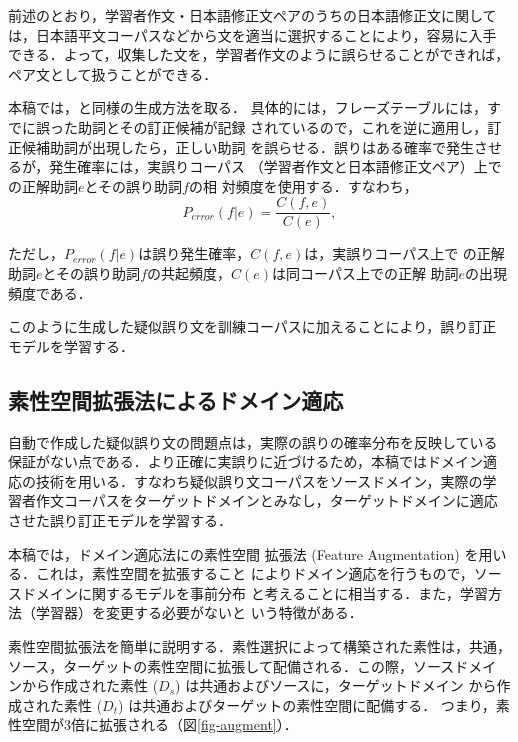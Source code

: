 \documentclass[japanese]{jnlp_1.4}
\begin{document}
前述のとおり，学習者作文・日本語修正文ペアのうちの日本語修正文に関して
は，日本語平文コーパスなどから文を適当に選択することにより，容易に入手
できる．よって，収集した文を，学習者作文のように誤らせることができれば，
ペア文として扱うことができる．

本稿では，と同様の生成方法を取る．
具体的には，フレーズテーブルには，すでに誤った助詞とその訂正候補が記録
されているので，これを逆に適用し，訂正候補助詞が出現したら，正しい助詞
を誤らせる．誤りはある確率で発生させるが，発生確率には，実誤りコーパス
（学習者作文と日本語修正文ペア）上での正解助詞$e$とその誤り助詞$f$の相
対頻度を使用する．すなわち，
\begin{equation}
P_{error}(f|e)  =  \frac{C(f,e)}{C(e)},
\end{equation}

ただし，$P_{error}(f|e)$は誤り発生確率，$C(f,e)$は，実誤りコーパス上で
の正解助詞$e$とその誤り助詞$f$の共起頻度，$C(e)$は同コーパス上での正解
助詞$e$の出現頻度である．

このように生成した疑似誤り文を訓練コーパスに加えることにより，誤り訂正
モデルを学習する．



\subsection{素性空間拡張法によるドメイン適応}
\label{sec-domain-adaptation}

自動で作成した疑似誤り文の問題点は，実際の誤りの確率分布を反映している
保証がない点である．より正確に実誤りに近づけるため，本稿ではドメイン適
応の技術を用いる．すなわち疑似誤り文コーパスをソースドメイン，実際の学
習者作文コーパスをターゲットドメインとみなし，ターゲットドメインに適応
させた誤り訂正モデルを学習する．

本稿では，ドメイン適応法にの素性空間
拡張法 (Feature Augmentation) を用いる．これは，素性空間を拡張すること
によりドメイン適応を行うもので，ソースドメインに関するモデルを事前分布
と考えることに相当する．また，学習方法（学習器）を変更する必要がないと
いう特徴がある．

素性空間拡張法を簡単に説明する．素性選択によって構築された素性は，共通，
ソース，ターゲットの素性空間に拡張して配備される．この際，ソースドメイ
ンから作成された素性 ($D_s$) は共通およびソースに，ターゲットドメイン
から作成された素性 ($D_t$) は共通およびターゲットの素性空間に配備する．
つまり，素性空間が3倍に拡張される（図\ref{fig-augment}）．
\end{document}
